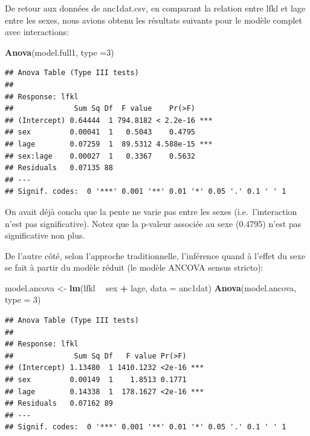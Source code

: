 \documentclass[12pt,]{book}
\newenvironment{Shaded}{\begin{snugshade}}{\end{snugshade}}
\newcommand{\DataTypeTok}[1]{\textcolor[rgb]{0.13,0.29,0.53}{#1}}
\newcommand{\DecValTok}[1]{\textcolor[rgb]{0.00,0.00,0.81}{#1}}
\newcommand{\KeywordTok}[1]{\textcolor[rgb]{0.13,0.29,0.53}{\textbf{#1}}}
\newcommand{\NormalTok}[1]{#1}
\newcommand{\OperatorTok}[1]{\textcolor[rgb]{0.81,0.36,0.00}{\textbf{#1}}}
\newcommand{\StringTok}[1]{\textcolor[rgb]{0.31,0.60,0.02}{#1}}
\begin{document}
De retour aux données de anc1dat.csv, en comparant la relation entre lfkl et lage entre les sexes, nous avions obtenu les résultats suivants pour le modèle complet avec interactions:

\begin{Shaded}
\begin{Highlighting}[]
\KeywordTok{Anova}\NormalTok{(model.full1, }\DataTypeTok{type =}\DecValTok{3}\NormalTok{)}
\end{Highlighting}
\end{Shaded}

\begin{verbatim}
## Anova Table (Type III tests)
## 
## Response: lfkl
##              Sum Sq Df  F value    Pr(>F)    
## (Intercept) 0.64444  1 794.8182 < 2.2e-16 ***
## sex         0.00041  1   0.5043    0.4795    
## lage        0.07259  1  89.5312 4.588e-15 ***
## sex:lage    0.00027  1   0.3367    0.5632    
## Residuals   0.07135 88                       
## ---
## Signif. codes:  0 '***' 0.001 '**' 0.01 '*' 0.05 '.' 0.1 ' ' 1
\end{verbatim}

On avait déjà conclu que la pente ne varie pas entre les sexes (i.e.~l'interaction n'est pas significative). Notez que la p-valeur associée au sexe (0.4795) n'est pas significative non plus.

De l'autre côté, selon l'approche traditionnelle, l'inférence quand à l'effet du sexe se fait à partir du modèle réduit (le modèle ANCOVA sensus stricto):

\begin{Shaded}
\begin{Highlighting}[]
\NormalTok{model.ancova <-}\StringTok{ }\KeywordTok{lm}\NormalTok{(lfkl }\OperatorTok{~}\StringTok{ }\NormalTok{sex }\OperatorTok{+}\StringTok{ }\NormalTok{lage, }\DataTypeTok{data =}\NormalTok{ anc1dat)}
\KeywordTok{Anova}\NormalTok{(model.ancova, }\DataTypeTok{type =} \DecValTok{3}\NormalTok{)}
\end{Highlighting}
\end{Shaded}

\begin{verbatim}
## Anova Table (Type III tests)
## 
## Response: lfkl
##              Sum Sq Df   F value Pr(>F)    
## (Intercept) 1.13480  1 1410.1232 <2e-16 ***
## sex         0.00149  1    1.8513 0.1771    
## lage        0.14338  1  178.1627 <2e-16 ***
## Residuals   0.07162 89                     
## ---
## Signif. codes:  0 '***' 0.001 '**' 0.01 '*' 0.05 '.' 0.1 ' ' 1
\end{verbatim}
\end{document}
